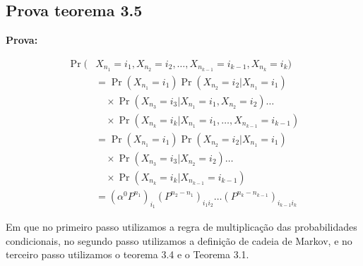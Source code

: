 \documentclass[12pt]{article}
\theoremstyle{break}
\begin{document}
\subsection{Prova teorema 3.5}



\textbf{Prova:}



\begin{align*}
    \Pr(&X_{n_1} = i_1, X_{n_2} = i_2, \dots, X_{n_{k-1}} = i_{k-1}, X_{n_k} = i_k) \\
    &= \Pr(X_{n_1} = i_1) \Pr(X_{n_2} = i_2 | X_{n_1} = i_1) \\
    &\quad \times \Pr(X_{n_3} = i_3 | X_{n_1} = i_1, X_{n_2} = i_2) \dots \\
    &\quad \times \Pr(X_{n_k} = i_k | X_{n_1} = i_1, \dots, X_{n_{k-1}} = i_{k-1}) \\
    &= \Pr(X_{n_1} = i_1) \Pr(X_{n_2} = i_2 | X_{n_1} = i_1) \\
    &\quad \times \Pr(X_{n_3} = i_3 | X_{n_2} = i_2) \dots \\
    &\quad \times \Pr(X_{n_k} = i_k | X_{n_{k-1}} = i_{k-1}) \\
    &= (\alpha^0 P^{n_1})_{i_1} (P^{n_2 - n_1})_{i_1 i_2} \dots (P^{n_k - n_{k-1}})_{i_{k-1} i_k}
\end{align*}


Em que no primeiro passo utilizamos a regra de multiplicação das probabilidades condicionais, no segundo passo utilizamos a definição de cadeia de Markov, e no terceiro passo utilizamos o teorema 3.4 e o Teorema 3.1.


\clearpage
\printbibliography %
\end{document}
